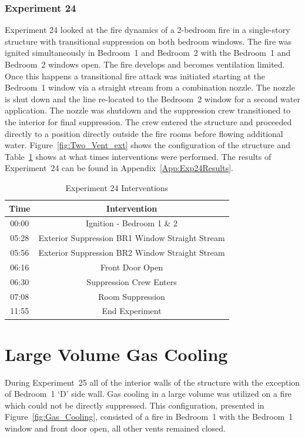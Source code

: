 \documentclass[12pt,oneside]{book}
\begin{document}
\subsubsection{Experiment 24}
Experiment 24 looked at the fire dynamics of a 2-bedroom fire in a single-story structure with transitional suppression on both bedroom windows. The fire was ignited simultaneously in Bedroom~1 and Bedroom~2 with the Bedroom~1 and Bedroom~2 windows open. The fire develops and becomes ventilation limited. Once this happens a transitional fire attack was initiated starting at the Bedroom~1 window via a straight stream from a combination nozzle. The nozzle is shut down and the line re-located to the Bedroom~2 window for a second water application. The nozzle was shutdown and the suppression crew transitioned to the interior for final suppression. The crew entered the structure and proceeded directly to a position directly outside the fire rooms before flowing additional water. Figure~\ref{fig:Two_Vent_ext} shows the configuration of the structure and Table~\ref{Table:Exp24Interventions} shows at what times interventions were performed. The results of Experiment~24 can be found in Appendix~\ref{App:Exp24Results}. 


\begin{table}[H]
	\centering
	\caption{Experiment 24 Interventions}
	\begin{tabular}{|c|c|} 
		\hline
		Time & Intervention \\ \hline \hline
		00:00 & Ignition - Bedroom 1 \& 2 \\ \hline
		05:28 & Exterior Suppression BR1 Window Straight Stream \\ \hline
		05:56 & Exterior Suppression BR2 Window Straight Stream \\ \hline		
		06:16 & Front Door Open \\ \hline
		06:30 & Suppression Crew Enters\\ \hline
		07:08 & Room Suppression \\ \hline 
		11:55 & End Experiment\\ \hline
	\end{tabular}
	\label{Table:Exp24Interventions}
\end{table}

\clearpage

\section{Large Volume Gas Cooling}
During Experiment~25 all of the interior walls of the structure with the exception of Bedroom~1 `D' side wall. Gas cooling in a large volume was utilized on a fire which could not be directly suppressed. This configuration, presented in Figure~\ref{fig:Gas_Cooling}, consisted of a fire in Bedroom~1 with the Bedroom~1 window and front door open, all other vents remained closed.  
\end{document}
